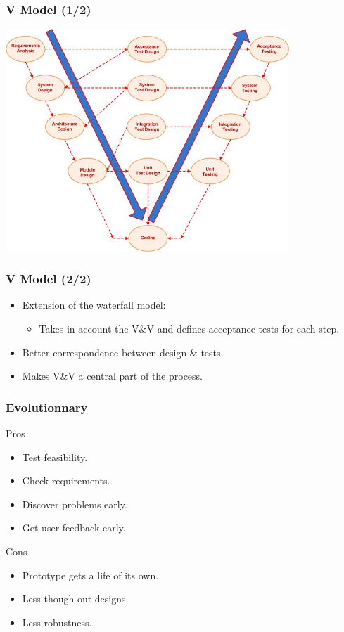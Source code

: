 \documentclass[10pt]{beamer}
\begin{document}
\begin{frame}[fragile]
  \frametitle{V Model (1/2)}
  \begin{center}
    \includegraphics[width=0.8\textwidth]{V-model}
  \end{center}
\end{frame}
\begin{frame}[fragile]
  \frametitle{V Model (2/2)}
  \begin{exampleblock}{}
    \begin{itemize}
    \item Extension of the waterfall model:
      \begin{itemize}
      \item Takes in account the V\&V and defines acceptance tests for each step.
      \end{itemize}
    \item Better correspondence between design \& tests.
    \item Makes V\&V a central part of the process.
    \end{itemize}
  \end{exampleblock}
\end{frame}


\begin{frame}[fragile]
  \frametitle{Evolutionnary}
  \begin{exampleblock}{Pros}
    \begin{itemize}
    \item Test feasibility.
    \item Check requirements.
    \item Discover problems early.
    \item Get user feedback early.
    \end{itemize}
  \end{exampleblock}
  \begin{alertblock}{Cons}
    \begin{itemize}
    \item Prototype gets a life of its own.
    \item Less though out designs.
    \item Less robustness.
    \end{itemize}
  \end{alertblock}
\end{frame}
\end{document}
